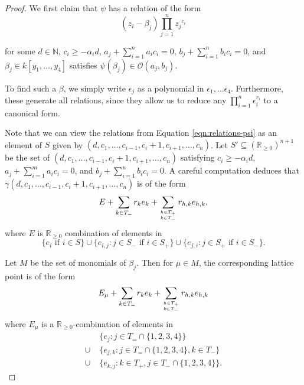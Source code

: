 \documentclass{amsart}
\theoremstyle{plain}
\theoremstyle{definition}
\theoremstyle{remark}
\numberwithin{equation}{section}
\newcommand\bida{a}
\newcommand\bidb{b}
\begin{document}
\begin{proof}
We first claim that $\psi$ has a relation of the form
\begin{equation}\label{eqn:relations-psi}
	(z_i - \beta_j)\prod_{j=1}^n {z_j}^{c_{i}}
\end{equation}

\noindent
for some $d\in \mathbb{N}$, $c_i \ge -\alpha_i d$, $\bida_j + \sum_{i = 1}
^n \bida_i c_i = 0$, $\bidb_j + \sum_{i=1}^n \bidb_i c_i = 0$, and $\beta_j \in
k[y_1, \ldots, y_4]$ satisfies $\psi(\beta_j)\in \mathscr{O}(\bida_j,
\bidb_j)$.

To find such a $\beta$, we simply write $\epsilon_j$ as a 
polynomial in $\epsilon_1, \ldots \epsilon _4$. Furthermore, these
generate all relations, since they allow us to reduce any $\prod_{i =
1}^n \epsilon_i^{r_i}$ to a canonical form. 

Note that we can view the relations from Equation
\ref{eqn:relations-psi} as an element of $S$ given
by $(d, c_1, \ldots, c_{i-1}, c_i + 1, c_{i+1}, \ldots , c_n)$.  Let $S'\subseteq (\mathbb{R}_{\ge 0})^{n+1}$ be the
set of $(d, c_1, \ldots, c_{i-1}, c_i + 1, c_{i+1}, \ldots , c_n)$ satisfying $c_i \ge -\alpha_i d$,
$\bida_j + \sum_{i = 1}^m \bida_i c_i = 0$, and $\bidb_j + \sum_{i=1}^n \bidb_i c_i
= 0$.  A careful computation deduces that $\gamma (d, c_1, \ldots, c_{i-1}, c_i + 1, c_{i+1}, \ldots, c_n)$ is of the form 
\[
	E + \sum_{k\in T_=} r_k e_k + \sum_{h\in T_+ \atop k\in T_-} r_{h,k} e_{h,k},
\] 
where $E$ is $\mathbb{R}_{\ge 0}$
combination of elements in 
\[
	\{e_i \mbox{ if } i\in S\} \cup \{e_{i,j}: j\in S_- \mbox{ if } i \in S_+\} \cup \{e_{j,i}: j\in S_+ \mbox{ if } i \in S_-\}.
\]


Let $M$ be the set of monomials of $\beta_j$.  Then for $\mu\in M$, the corresponding lattice point is of the form
\[
	E_\mu + \sum_{k\in T_=} r_k e_k + \sum_{h\in T_+ \atop k\in T_-} r_{h,k} e_{h,k}
\]
where $E_\mu$ is a $\mathbb{R}_{\ge 0}$-combination of elements in
\begin{align*}
			& \{e_j : j\in T_= \cap \{1, 2, 3, 4\}\} \\
	\cup \; 	& \{e_{j, k}: j\in T_= \cap \{1, 2, 3, 4\}, k\in T_-\}\\
	\cup \; 	& \{e_{k,j}: k\in T_+, j\in T_- \cap \{1, 2, 3, 4\}\}.
\end{align*}


\end{proof}
\end{document}
